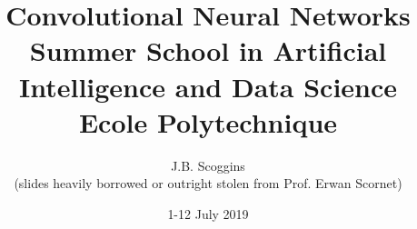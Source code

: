 

\usepackage{pdfpages}
\usepackage{tikz}
\usepackage{dsfont}

\usepackage[style=alphabetic, citestyle = authoryear, maxcitenames=2,backend=biber]{biblatex}


\newcommand\citem[1]{{\scriptsize[\citetitle{#1}, \cite{#1}]}}

\newcommand\redd[1]{\textcolor{red}{#1}}
\newcommand\blue[1]{\textcolor{blue}{#1}}
\newcommand\iid{\textit{i.i.d.}}
\newcommand\R{\mathds{R}}
\newcommand\bx{\mathbf{x}}
\renewcommand\pen{\textrm{pen}}
\newcommand{\E}{\mathds{E}}
\newcommand{\V}{\mathds{V}}
\newcommand{\cov}{\mathds{C}}
\renewcommand{\P}{\mathds{P}}

\usepackage{ifthen}
\newcommand{\ifinclude}[1]{\ifthenelse{\boolean{correction_bool}}{#1}{}}

\usepackage{graphicx}
\graphicspath{{../}}
\usepackage{ragged2e}




\title[AI Summer School - CNNs]{Convolutional Neural Networks\\ \vspace*{2mm}
\small Summer School in Artificial Intelligence and Data Science\\
Ecole Polytechnique
}

\author[J.B. Scoggins]{J.B. Scoggins\\
\tiny(slides heavily borrowed or outright stolen from Prof. Erwan Scornet)
}

\date{1-12 July 2019}



\begin{frame}
  \titlepage
\end{frame}




